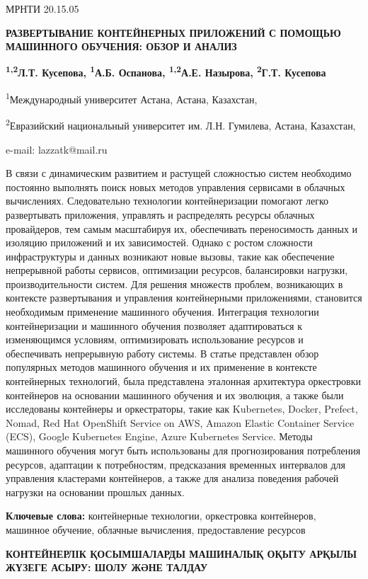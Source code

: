 МРНТИ 20.15.05

{\bfseries РАЗВЕРТЫВАНИЕ КОНТЕЙНЕРНЫХ ПРИЛОЖЕНИЙ С ПОМОЩЬЮ МАШИННОГО
ОБУЧЕНИЯ: ОБЗОР И АНАЛИЗ}

{\bfseries \textsuperscript{1,2}Л.Т. Кусепова, \textsuperscript{1}А.Б.
Оспанова, \textsuperscript{1,2}А.Е. Назырова, \textsuperscript{2}Г.Т.
Кусепова}

\textsuperscript{1}Международный университет Астана, Астана, Казахстан,

\textsuperscript{2}Евразийский национальный университет им. Л.Н.
Гумилева, Астана, Казахстан,

e-mail: lazzatk@mail.ru

В связи с динамическим развитием и растущей сложностью систем необходимо
постоянно выполнять поиск новых методов управления сервисами в облачных
вычислениях. Следовательно технологии контейнеризации помогают легко
развертывать приложения, управлять и распределять ресурсы облачных
провайдеров, тем самым масштабируя их, обеспечивать переносимость данных
и изоляцию приложений и их зависимостей. Однако с ростом сложности
инфраструктуры и данных возникают новые вызовы, такие как обеспечение
непрерывной работы сервисов, оптимизации ресурсов, балансировки
нагрузки, производительности систем. Для решения множеств проблем,
возникающих в контексте развертывания и управления контейнерными
приложениями, становится необходимым применение машинного обучения.
Интеграция технологии контейнеризации и машинного обучения позволяет
адаптироваться к изменяющимся условиям, оптимизировать использование
ресурсов и обеспечивать непрерывную работу системы. В статье представлен
обзор популярных методов машинного обучения и их применение в контексте
контейнерных технологий, была представлена эталонная архитектура
оркестровки контейнеров на основании машинного обучения и их эволюция, а
также были исследованы контейнеры и оркестраторы, такие как Kubernetes,
Docker, Prefect, Nomad, Red Hat OpenShift Service on AWS, Amazon Elastic
Container Service (ECS), Google Kubernetes Engine, Azure Kubernetes
Service. Методы машинного обучения могут быть использованы для
прогнозирования потребления ресурсов, адаптации к потребностям,
предсказания временных интервалов для управления кластерами контейнеров,
а также для анализа поведения рабочей нагрузки на основании прошлых
данных.

{\bfseries Ключевые слова:} контейнерные технологии, оркестровка
контейнеров, машинное обучение, облачные вычисления, предоставление
ресурсов

{\bfseries КОНТЕЙНЕРЛІК ҚОСЫМШАЛАРДЫ МАШИНАЛЫҚ ОҚЫТУ АРҚЫЛЫ ЖҮЗЕГЕ АСЫРУ:
ШОЛУ ЖӘНЕ ТАЛДАУ}

